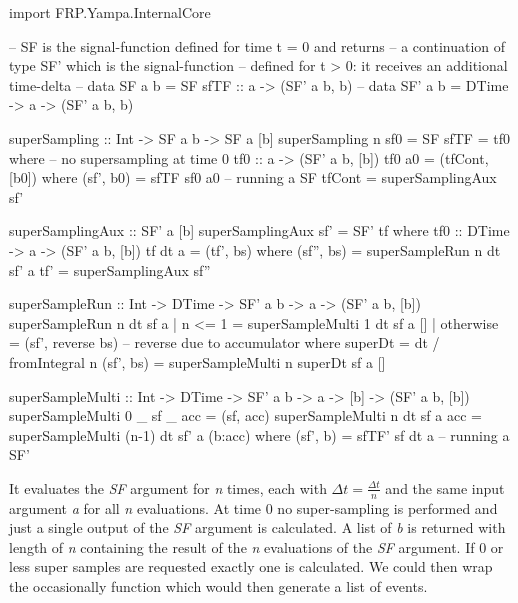 \begin{HaskellCode}
import FRP.Yampa.InternalCore

-- SF is the signal-function defined for time t = 0 and returns
-- a continuation of type SF' which is the signal-function 
-- defined for t > 0: it receives an additional time-delta
-- data SF a b  = SF { sfTF :: a -> (SF' a b, b) }
-- data SF' a b = DTime -> a -> (SF' a b, b)

superSampling :: Int -> SF a b -> SF a [b]
superSampling n sf0 = SF { sfTF = tf0 }
  where
    -- no supersampling at time 0
    tf0 :: a -> (SF' a b, [b])
    tf0 a0 = (tfCont, [b0])
      where
        (sf', b0) = sfTF sf0 a0 -- running a SF
        tfCont    = superSamplingAux sf'

    superSamplingAux :: SF' a [b]
    superSamplingAux sf' = SF' tf
      where
      	tf0 :: DTime -> a -> (SF' a b, [b])
        tf dt a = (tf', bs)
          where
            (sf'', bs) = superSampleRun n dt sf' a
            tf'        = superSamplingAux sf''

    superSampleRun :: Int -> DTime -> SF' a b -> a -> (SF' a b, [b])
    superSampleRun n dt sf a 
        | n <= 1    = superSampleMulti 1 dt sf a []
        | otherwise = (sf', reverse bs)  -- reverse due to accumulator
      where
        superDt = dt / fromIntegral n
        (sf', bs) = superSampleMulti n superDt sf a []

    superSampleMulti :: Int -> DTime -> SF' a b -> a -> [b] -> (SF' a b, [b])
    superSampleMulti 0 _ sf _ acc  = (sf, acc)
    superSampleMulti n dt sf a acc = superSampleMulti (n-1) dt sf' a (b:acc) 
      where
        (sf', b) = sfTF' sf dt a -- running a SF'
\end{HaskellCode}

It evaluates the \textit{SF} argument for \textit{n} times, each with $\Delta t = \frac{\Delta t}{n}$ and the same input argument \textit{a} for all \textit{n} evaluations. At time 0 no super-sampling is performed and just a single output of the \textit{SF} argument is calculated. A list of \textit{b} is returned with length of \textit{n} containing the result of the \textit{n} evaluations of the \textit{SF} argument. If 0 or less super samples are requested exactly one is calculated. We could then wrap the occasionally function which would then generate a list of events. 

